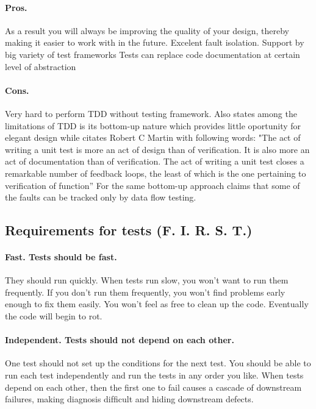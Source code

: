 \documentclass{llncs}
\begin{document}
\paragraph{Pros.\cite{STCraft}}
As a result you will always be improving the quality of your design, thereby making it easier to work with in the future.\cite{tdd}
Excelent fault isolation. Support by big variety of test frameworks \cite{STCraft}
Tests can replace code documentation at certain level of abstraction \cite{MartinClean}

\paragraph{Cons.}
Very hard to perform TDD without testing framework. \cite{STCraft}
Also \cite{STCraft} states among the limitations of TDD is its bottom-up nature which provides little oportunity for elegant design while \cite{tdd} citates Robert C Martin with following words: "The act of writing a unit test is more an act of design than of verification.  It is also more an act of documentation than of verification.  The act of writing a unit test closes a remarkable number of feedback loops, the least of which is the one pertaining to verification of function”  For the same bottom-up approach \cite{STCraft} claims that some of the faults can be tracked only by data flow testing.


\subsection{Requirements for tests (F. I. R. S. T.)}

\paragraph{Fast. Tests should be fast.} 
They should run quickly. When tests run slow, you won’t want to run them frequently. 
If you don’t run them frequently, you won’t ﬁnd problems early enough to ﬁx them easily. 
You won’t feel as free to clean up the code. Eventually the code will begin to rot.\cite{MartinClean}

\paragraph{Independent. Tests should not depend on each other.} 
One test should not set up the conditions for the next test. 
You should be able to run each test independently and run the tests in any order you like. 
When tests depend on each other, then the ﬁrst one to fail causes a cascade of downstream failures, making diagnosis difﬁcult and hiding downstream defects.\cite{MartinClean}
\end{document}
